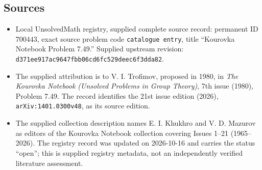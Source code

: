 \documentclass[11pt]{article}
\begin{document}
\subsection{Sources}
\begin{itemize}
\item Local UnsolvedMath registry, supplied complete source record: permanent ID \(700443\), exact source problem code \texttt{catalogue entry}, title ``Kourovka Notebook Problem 7.49.'' Supplied upstream revision: \texttt{d371ee917ac9647fbb06cd6fc529deec6f3dda82}.
\item The supplied attribution is to V. I. Trofimov, proposed in 1980, in \emph{The Kourovka Notebook (Unsolved Problems in Group Theory)}, 7th issue (1980), Problem 7.49. The record identifies the 21st issue edition (2026), \texttt{arXiv:1401.0300v48}, as its source edition.
\item The supplied collection description names E. I. Khukhro and V. D. Mazurov as editors of the Kourovka Notebook collection covering Issues 1--21 (1965--2026). The registry record was updated on 2026-10-16 and carries the status ``open''; this is supplied registry metadata, not an independently verified literature assessment.
\end{itemize}
\end{document}
